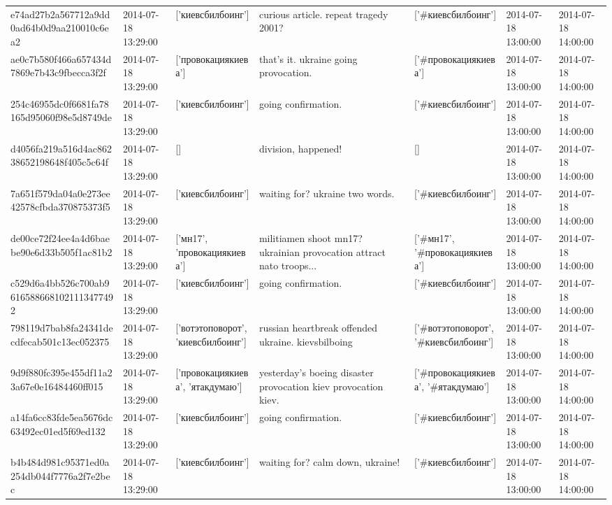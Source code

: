 \begin{tabular}{lllllll}
e74ad27b2a567712a9dd0ad64b0d9aa210010c6ea2 & 2014-07-18 13:29:00 & ['киевсбилбоинг'] & curious article. repeat tragedy 2001? & ['#киевсбилбоинг'] & 2014-07-18 13:00:00 & 2014-07-18 14:00:00 \\
ae0c7b580f466a657434d7869e7b43c9fbecca3f2f & 2014-07-18 13:29:00 & ['провокациякиева'] & that's it. ukraine going provocation. & ['#провокациякиева'] & 2014-07-18 13:00:00 & 2014-07-18 14:00:00 \\
254c46955dc0f6681fa78165d95060f98e5d8749de & 2014-07-18 13:29:00 & ['киевсбилбоинг'] & going confirmation. & ['#киевсбилбоинг'] & 2014-07-18 13:00:00 & 2014-07-18 14:00:00 \\
d4056fa219a516d4ac86238652198648f405c5c64f & 2014-07-18 13:29:00 & [] & division, happened! & [] & 2014-07-18 13:00:00 & 2014-07-18 14:00:00 \\
7a651f579da04a0e273ee42578cfbda370875373f5 & 2014-07-18 13:29:00 & ['киевсбилбоинг'] & waiting for? ukraine two words. & ['#киевсбилбоинг'] & 2014-07-18 13:00:00 & 2014-07-18 14:00:00 \\
de00ce72f24ee4a4d6baebe90e6d33b505f1ac81b2 & 2014-07-18 13:29:00 & ['мн17', 'провокациякиева'] & militiamen shoot mn17? ukrainian provocation attract nato troops... & ['#мн17', '#провокациякиева'] & 2014-07-18 13:00:00 & 2014-07-18 14:00:00 \\
c529d6a4bb526c700ab96165886681021113477492 & 2014-07-18 13:29:00 & ['киевсбилбоинг'] & going confirmation. & ['#киевсбилбоинг'] & 2014-07-18 13:00:00 & 2014-07-18 14:00:00 \\
798119d7bab8fa24341decdfecab501c13ec052375 & 2014-07-18 13:29:00 & ['вотэтоповорот', 'киевсбилбоинг'] & russian heartbreak offended ukraine. kievsbilboing & ['#вотэтоповорот', '#киевсбилбоинг'] & 2014-07-18 13:00:00 & 2014-07-18 14:00:00 \\
9d9f880fc395e455df11a23a67e0e16484460ff015 & 2014-07-18 13:29:00 & ['провокациякиева', 'ятакдумаю'] & yesterday's boeing disaster provocation kiev provocation kiev. & ['#провокациякиева', '#ятакдумаю'] & 2014-07-18 13:00:00 & 2014-07-18 14:00:00 \\
a14fa6cc83fde5ea5676dc63492ec01ed5f69ed132 & 2014-07-18 13:29:00 & ['киевсбилбоинг'] & going confirmation. & ['#киевсбилбоинг'] & 2014-07-18 13:00:00 & 2014-07-18 14:00:00 \\
b4b484d981c95371ed0a254db044f7776a2f7e2bec & 2014-07-18 13:29:00 & ['киевсбилбоинг'] & waiting for? calm down, ukraine! & ['#киевсбилбоинг'] & 2014-07-18 13:00:00 & 2014-07-18 14:00:00 \\

\end{tabular}
